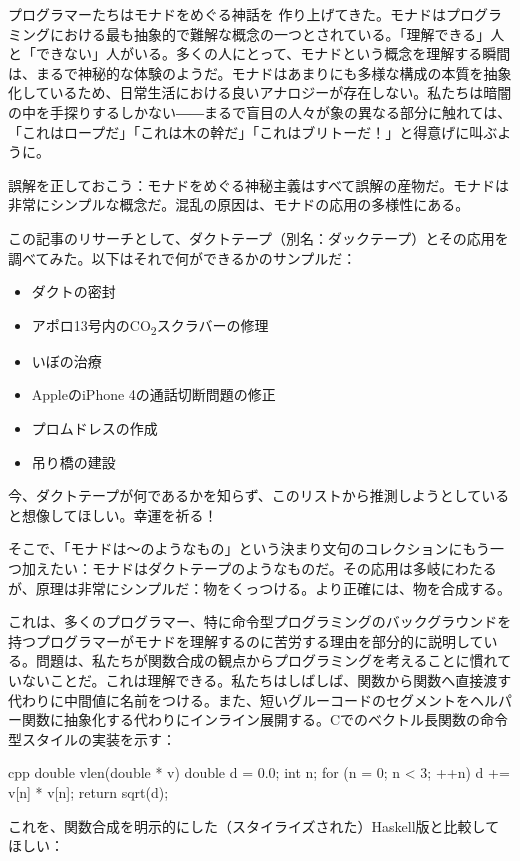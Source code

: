 
\lettrine[lhang=0.17]{プ}{ログラマーたちはモナドをめぐる神話を} 作り上げてきた。モナドはプログラミングにおける最も抽象的で難解な概念の一つとされている。「理解できる」人と「できない」人がいる。多くの人にとって、モナドという概念を理解する瞬間は、まるで神秘的な体験のようだ。モナドはあまりにも多様な構成の本質を抽象化しているため、日常生活における良いアナロジーが存在しない。私たちは暗闇の中を手探りするしかない――まるで盲目の人々が象の異なる部分に触れては、「これはロープだ」「これは木の幹だ」「これはブリトーだ！」と得意げに叫ぶように。

誤解を正しておこう：モナドをめぐる神秘主義はすべて誤解の産物だ。モナドは非常にシンプルな概念だ。混乱の原因は、モナドの応用の多様性にある。

この記事のリサーチとして、ダクトテープ（別名：ダックテープ）とその応用を調べてみた。以下はそれで何ができるかのサンプルだ：

\begin{itemize}
  \tightlist
  \item
        ダクトの密封
  \item
        アポロ13号内のCO\textsubscript{2}スクラバーの修理
  \item
        いぼの治療
  \item
        AppleのiPhone 4の通話切断問題の修正
  \item
        プロムドレスの作成
  \item
        吊り橋の建設
\end{itemize}

\noindent
今、ダクトテープが何であるかを知らず、このリストから推測しようとしていると想像してほしい。幸運を祈る！

そこで、「モナドは〜のようなもの」という決まり文句のコレクションにもう一つ加えたい：モナドはダクトテープのようなものだ。その応用は多岐にわたるが、原理は非常にシンプルだ：物をくっつける。より正確には、物を合成する。

これは、多くのプログラマー、特に命令型プログラミングのバックグラウンドを持つプログラマーがモナドを理解するのに苦労する理由を部分的に説明している。問題は、私たちが関数合成の観点からプログラミングを考えることに慣れていないことだ。これは理解できる。私たちはしばしば、関数から関数へ直接渡す代わりに中間値に名前をつける。また、短いグルーコードのセグメントをヘルパー関数に抽象化する代わりにインライン展開する。Cでのベクトル長関数の命令型スタイルの実装を示す：

\begin{snip}{cpp}
double vlen(double * v) {
    double d = 0.0;
    int n;
    for (n = 0; n < 3; ++n)
        d += v[n] * v[n];
    return sqrt(d);
}
\end{snip}
これを、関数合成を明示的にした（スタイライズされた）Haskell版と比較してほしい：

